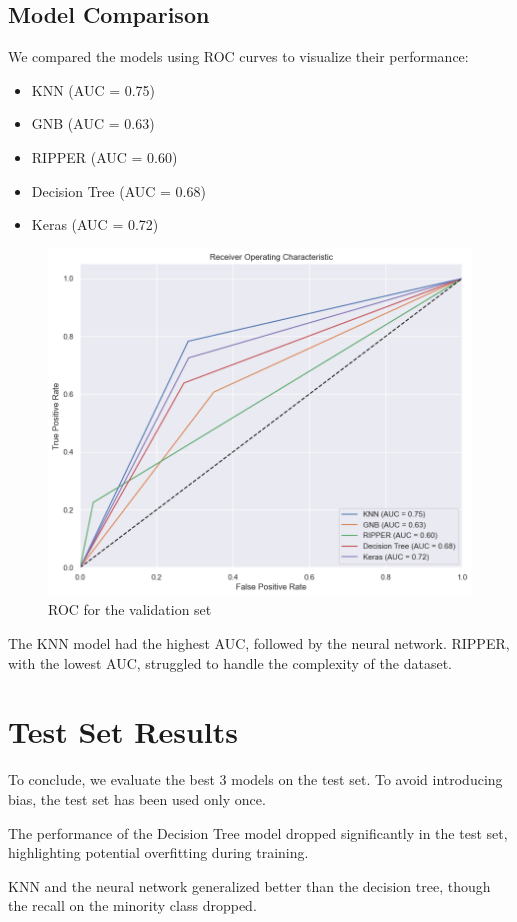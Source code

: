 \documentclass{article}
\begin{document}
\subsection{Model Comparison}
We compared the models using ROC curves to visualize their performance:
\begin{itemize}
    \item KNN (AUC = 0.75)
    \item GNB (AUC = 0.63)
    \item RIPPER (AUC = 0.60)
    \item Decision Tree (AUC = 0.68)
    \item Keras (AUC = 0.72)
\end{itemize}

\begin{figure}[H]
    \centering
    \includegraphics[width=0.8\linewidth]{valset.png}
    \caption{ROC for the validation set}
    \label{fig:enter-label}
\end{figure}

The KNN model had the highest AUC, followed by the neural network. RIPPER, with the lowest AUC, struggled to handle the complexity of the dataset.

\section{Test Set Results}
To conclude, we evaluate the best 3 models on the test set. 
To avoid introducing bias, the test set has been used only once.

The performance of the Decision Tree model dropped significantly in the test set, highlighting potential overfitting during training.

KNN and the neural network generalized better than the decision tree, though the recall on the minority class dropped.
\end{document}
